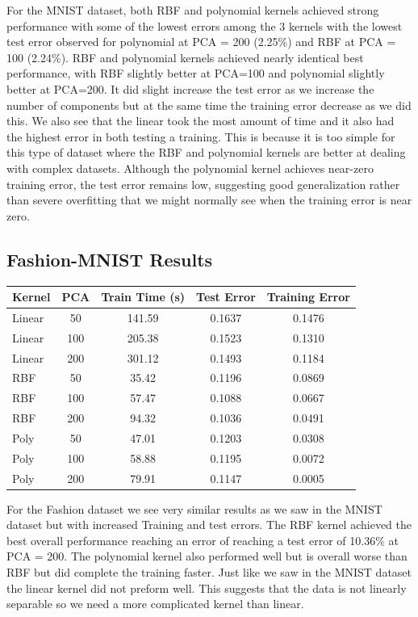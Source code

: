 \documentclass{article}
\begin{document}
For the MNIST dataset, both RBF and polynomial kernels achieved strong performance with some of the lowest errors among the 3 kernels with the lowest test error observed for polynomial at PCA = 200 (2.25\%) and RBF at PCA = 100 (2.24\%). RBF and polynomial kernels achieved nearly identical best performance, with RBF slightly better at PCA=100 and polynomial slightly better at PCA=200. It did slight increase the test error as we increase the number of components but at the same time the training error decrease as we did this. We also see that the linear took the most amount of time and it also had the highest error in both testing a training. This is because it is too simple for this type of dataset where the RBF and polynomial kernels are better at dealing with complex datasets. Although the polynomial kernel achieves near-zero training error, the test error remains low, suggesting good generalization rather than severe overfitting that we might normally see when the training error is near zero. 

\subsection*{Fashion-MNIST Results}

\begin{center}
\begin{tabular}{lcccc}
\toprule
Kernel & PCA & Train Time (s) & Test Error & Training Error \\
\midrule
Linear & 50  & 141.59 & 0.1637 & 0.1476 \\
Linear & 100 & 205.38 & 0.1523 & 0.1310 \\
Linear & 200 & 301.12 & 0.1493 & 0.1184 \\
\midrule
RBF    & 50  & 35.42  & 0.1196 & 0.0869 \\
RBF    & 100 & 57.47 & 0.1088 & 0.0667 \\
RBF    & 200 & 94.32 & 0.1036 & 0.0491 \\
\midrule
Poly   & 50  & 47.01  & 0.1203 & 0.0308 \\
Poly   & 100 & 58.88  & 0.1195 & 0.0072 \\
Poly   & 200 & 79.91  & 0.1147 & 0.0005 \\
\bottomrule
\end{tabular}
\end{center}

For the Fashion dataset we see very similar results as we saw in the MNIST dataset but with increased Training and test errors. The RBF kernel achieved the best overall performance reaching an error of reaching a test error of 10.36\% at PCA = 200. The polynomial kernel also performed well but is overall worse than RBF but did complete the training faster. Just like we saw in the MNIST dataset the linear kernel did not preform well. This suggests that the data is not linearly separable so we need a more complicated kernel than linear. \\
\end{document}
